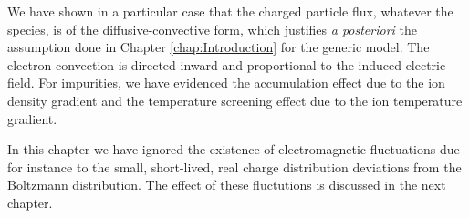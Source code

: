 We have shown in a particular case that the charged particle flux, whatever the species, is of the diffusive-convective form, which justifies \textit{a posteriori} the assumption done in Chapter \ref{chap:Introduction} for the generic model. The electron convection is directed inward and proportional to the induced electric field. For impurities, we have evidenced the accumulation effect due to the ion density gradient and the temperature screening effect due to the ion temperature gradient. 

In this chapter we have ignored the existence of electromagnetic fluctuations due for instance to the small, short-lived, real charge distribution deviations from the Boltzmann distribution. The effect of these fluctutions is discussed in the next chapter. 

